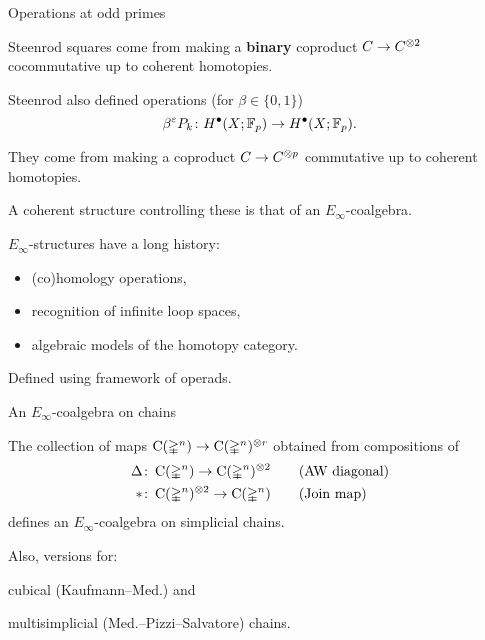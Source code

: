 
\begin{frame}{Operations at odd primes}

	\pause

	Steenrod squares come from making a \textbf{binary} coproduct $C \to C^{\otimes 2}$ cocommutative up to coherent homotopies.

	\medskip\pause

	Steenrod also defined operations (for $\beta \in \{0,1\}$)
	\[
	\beta^{\varepsilon} P_k \colon H^\bullet(X; {\mathbb{F}_p}) \to H^\bullet(X; {\mathbb{F}_p}).
	\]

	\pause

	They come from making a coproduct $C \to C^{\otimes p}$ commutative up to coherent homotopies.

	\medskip\pause

	A coherent structure controlling these is that of an $E_\infty$-coalgebra.

	\medskip\pause

	$E_\infty$-structures have a long history:
	\begin{itemize}
		\item (co)homology operations,
		\item recognition of infinite loop spaces,
		\item algebraic models of the homotopy category.
	\end{itemize}

	\medskip\pause

	Defined using framework of operads.
\end{frame}

\begin{frame}{An $E_\infty$-coalgebra on chains}
	\begin{theorem}[Med.]
		The collection of maps $\operatorname{C}(\mathbb{\Delta}^n) \to \operatorname{C}(\mathbb{\Delta}^n)^{\otimes r}$ obtained from compositions of
		\begin{align*}
			\Delta &\colon \operatorname{C}(\mathbb{\Delta}^n) \to \operatorname{C}(\mathbb{\Delta}^n)^{\otimes 2}
			\qquad \text{(AW diagonal)} \\
			\ast &\colon \operatorname{C}(\mathbb{\Delta}^n)^{\otimes 2} \to \operatorname{C}(\mathbb{\Delta}^n)
			\qquad \text{(Join map)}
		\end{align*}
		defines an $E_\infty$-coalgebra on simplicial chains.
	\end{theorem}

	\pause

	\qquad \qquad \scalebox{0.7}{}

	\medskip\pause

	Also, versions for: \par
		\qquad \textcolor{pblue}{cubical} (Kaufmann--Med.) and \par
		\qquad \textcolor{pblue}{multisimplicial} (Med.--Pizzi--Salvatore) chains.
\end{frame}

